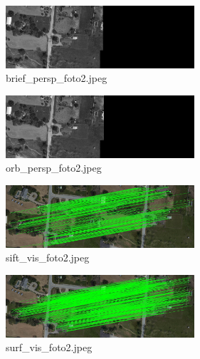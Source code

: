 \documentclass[twoside,twocolumn]{article}
\begin{document}
\begin{figure}[H]
\begin{center}
	\includegraphics[width=7cm]{figures/brief_persp_foto2.jpeg}
\caption{brief\_persp\_foto2.jpeg} \label{brief_persp_foto2}
\end{center}
\end{figure}

\begin{figure}[H]
\begin{center}
	\includegraphics[width=7cm]{figures/orb_persp_foto2.jpeg}
\caption{orb\_persp\_foto2.jpeg} \label{orb_persp_foto2}
\end{center}
\end{figure}

\begin{figure}[H]
\begin{center}
	\includegraphics[width=7cm]{figures/sift_vis_foto2.jpeg}
\caption{sift\_vis\_foto2.jpeg} \label{sift_vis_foto2}
\end{center}
\end{figure}

\begin{figure}[H]
\begin{center}
	\includegraphics[width=7cm]{figures/surf_vis_foto2.jpeg}
\caption{surf\_vis\_foto2.jpeg} \label{surf_vis_foto2}
\end{center}
\end{figure}
\end{document}
